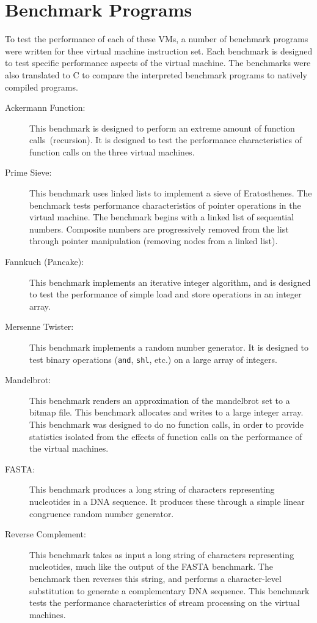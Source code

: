 	\section{Benchmark Programs}
	To test the performance of each of these VMs, a number of benchmark programs were written for thee virtual machine instruction set. Each benchmark is designed to test specific performance aspects of the virtual machine. The benchmarks were also translated to C to compare the interpreted benchmark programs to natively compiled programs.
	
	\begin{description}
		\item[Ackermann Function:] This benchmark is designed to perform an extreme amount of function calls~(recursion). It is designed to test the performance characteristics of function calls on the three virtual machines.
		\item[Prime Sieve:] This benchmark uses linked lists to implement a sieve of Eratosthenes. The benchmark tests performance characteristics of pointer operations in the virtual machine. The benchmark begins with a linked list of sequential numbers. Composite numbers are progressively removed from the list through pointer manipulation (removing nodes from a linked list).
		\item[Fannkuch (Pancake):] This benchmark implements an iterative integer algorithm, and is designed to test the performance of simple load and store operations in an integer array.
		\item[Mersenne Twister:] This benchmark implements a random number generator. It is designed to test binary operations (\texttt{and}, \texttt{shl}, etc.) on a large array of integers.
		\item[Mandelbrot:] This benchmark renders an approximation of the mandelbrot set to a bitmap file. This benchmark allocates and writes to a large integer array. This benchmark was designed to do no function calls, in order to provide statistics isolated from the effects of function calls on the performance of the virtual machines.
		\item[FASTA:] This benchmark produces a long string of characters representing nucleotides in a DNA sequence. It produces these through a simple linear congruence random number generator. 
		\item[Reverse Complement:] This benchmark takes as input a long string of characters representing nucleotides, much like the output of the FASTA benchmark. The benchmark then reverses this string, and performs a character-level substitution to generate a complementary DNA sequence. This benchmark tests the performance characteristics of stream processing on the virtual machines.
	\end{description}
	

